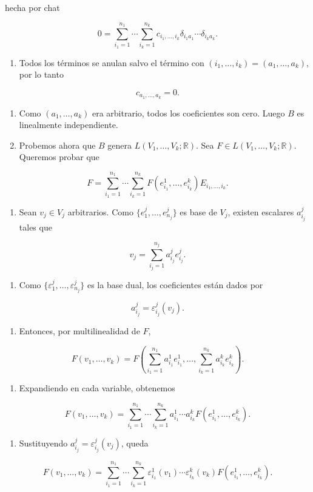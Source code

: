 \begin{bookproof}{hecha por chat}
\begin{enumerate}[start=9]
\end{enumerate}
\[
0=\sum_{i_1=1}^{n_1}\cdots\sum_{i_k=1}^{n_k}c_{i_1,\ldots,i_k}\delta_{i_1a_1}\cdots\delta_{i_ka_k}.
\]
\begin{enumerate}[start=10]
\item Todos los términos se anulan salvo el término con $(i_1,\ldots,i_k)=(a_1,\ldots,a_k)$, por lo tanto
\end{enumerate}
\[
c_{a_1,\ldots,a_k}=0.
\]
\begin{enumerate}[start=11]
\item Como $(a_1,\ldots,a_k)$ era arbitrario, todos los coeficientes son cero. Luego $B$ es linealmente independiente.
\item Probemos ahora que $B$ genera $L(V_1,\ldots,V_k;\mathbb R)$. Sea $F\in L(V_1,\ldots,V_k;\mathbb R)$. Queremos probar que
\end{enumerate}
\[
F=\sum_{i_1=1}^{n_1}\cdots\sum_{i_k=1}^{n_k}F(e^1_{i_1},\ldots,e^k_{i_k})E_{i_1,\ldots,i_k}.
\]
\begin{enumerate}[start=13]
\item Sean $v_j\in V_j$ arbitrarios. Como $\{e^j_1,\ldots,e^j_{n_j}\}$ es base de $V_j$, existen escalares $a^j_{i_j}$ tales que
\end{enumerate}
\[
v_j=\sum_{i_j=1}^{n_j}a^j_{i_j}e^j_{i_j}.
\]
\begin{enumerate}[start=14]
\item Como $\{\varepsilon^j_1,\ldots,\varepsilon^j_{n_j}\}$ es la base dual, los coeficientes están dados por
\end{enumerate}
\[
a^j_{i_j}=\varepsilon^j_{i_j}(v_j).
\]
\begin{enumerate}[start=15]
\item Entonces, por multilinealidad de $F$,
\end{enumerate}
\[
F(v_1,\ldots,v_k)=F\left(\sum_{i_1=1}^{n_1}a^1_{i_1}e^1_{i_1},\ldots,\sum_{i_k=1}^{n_k}a^k_{i_k}e^k_{i_k}\right).
\]
\begin{enumerate}[start=16]
\item Expandiendo en cada variable, obtenemos
\end{enumerate}
\[
F(v_1,\ldots,v_k)=\sum_{i_1=1}^{n_1}\cdots\sum_{i_k=1}^{n_k}a^1_{i_1}\cdots a^k_{i_k}F(e^1_{i_1},\ldots,e^k_{i_k}).
\]
\begin{enumerate}[start=17]
\item Sustituyendo $a^j_{i_j}=\varepsilon^j_{i_j}(v_j)$, queda
\end{enumerate}
\[
F(v_1,\ldots,v_k)=\sum_{i_1=1}^{n_1}\cdots\sum_{i_k=1}^{n_k}\varepsilon^1_{i_1}(v_1)\cdots\varepsilon^k_{i_k}(v_k)F(e^1_{i_1},\ldots,e^k_{i_k}).
\]
\end{bookproof}
